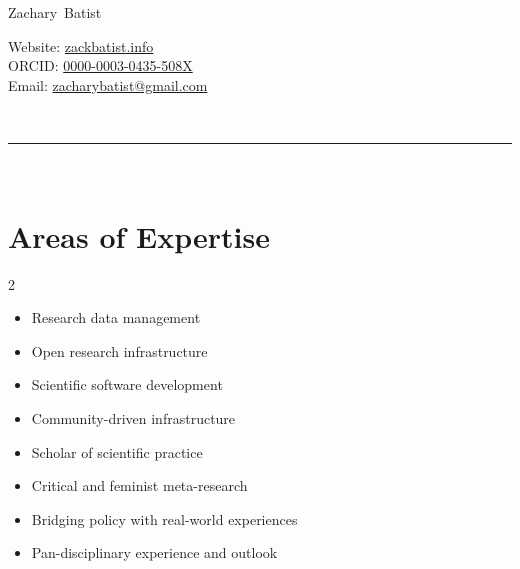 \documentclass[11pt, a4paper]{article}
\makeatletter
\newcommand{\FirstName}{Zachary}
\newcommand{\LastName}{Batist}
\newcommand{\MyName}{\FirstName\ \LastName}
\newcommand{\Email}{zacharybatist@gmail.com}
\newcommand{\PersonalWebsite}{zackbatist.info}
\newcommand{\MyGitHub}{zackbatist}
\newcommand{\Twitter}{@mtl\_zack}
\newcommand{\Mastodon}{archaeo.social/@zackbatist}
\newcommand{\ORCID}{0000-0003-0435-508X}
\newcommand{\Duration}[2]{\fontsize{9pt}{0}\selectfont #1 -- #2}
\newcommand{\Ongoing}{\fontsize{8pt}{0}\selectfont present}
\newcommand{\Appointment}[4]{\textbf{#1} \newline #2 \newline #3 \newline #4}
\newif\iffirstsub
\newcommand{\CVSection}[2][-1em]{\Needspace{7\baselineskip}\vspace{-2.6em}\section{#2}\vspace{#1}\firstsubtrue}
\makeatother
\begin{document}
\thispagestyle{empty}

{\fontsize{22pt}{0}\selectfont\MyName}\\[-1.5cm]
\begin{minipage}[t]{1\textwidth}
  \begin{flushright}
    Website: \href{https://\PersonalWebsite}{\PersonalWebsite}\\
    ORCID: \href{https://orcid.org/\ORCID}{\ORCID}\\
    Email: \href{mailto:\Email}{\Email}
  \end{flushright}
\end{minipage}\\[0.1cm]
\rule{\textwidth}{0.2pt}\\[-1cm]

\vspace{0.4cm}



\vspace{0.6em}\CVSection[-2em]{Areas of Expertise}
\begin{multicols}{2}
  \begin{itemize}
      \item Research data management
      \item Open research infrastructure
      \item Scientific software development
      \item Community-driven infrastructure
      \item Scholar of scientific practice
      \item Critical and feminist meta-research
      \item Bridging policy with real-world experiences
      \item Pan-disciplinary experience and outlook
  \end{itemize}
\end{multicols}
\end{document}
